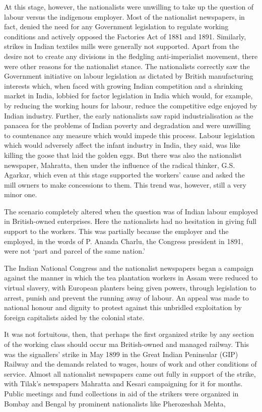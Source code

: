 At this stage, however, the nationalists were unwilling to take up the question of labour versus the indigenous employer. Most of the nationalist newspapers, in fact, denied the need for any Government legislation to regulate working conditions and actively opposed the Factories Act of 1881 and 1891. Similarly, strikes in Indian textiles mills were generally not supported. Apart from the desire not to create any divisions in the fledgling anti-imperialist movement, there were other reasons for the nationalist stance. The nationalists correctly saw the Government initiative on labour legislation as dictated by British manufacturing interests which, when faced with growing Indian competition and a shrinking market in India, lobbied for factor legislation in India which would, for example, by reducing the working hours for labour, reduce the competitive edge enjoyed by Indian industry. Further, the early nationalists saw rapid industrialisation as the panacea for the problems of Indian poverty and degradation and were unwilling to countenance any measure which would impede this process. Labour legislation which would adversely affect the infant industry in India, they said, was like killing the goose that laid the golden eggs. But there was also the nationalist newspaper, Mahratta, then under the influence of the radical thinker, G.S. Agarkar, which even at this stage supported the workers’ cause and asked the mill owners to make concessions to them. This trend was, however, still a very minor one.

The scenario completely altered when the question was of Indian labour employed in British-owned enterprises. Here the nationalists had no hesitation in giving full support to the workers. This was partially because the employer and the employed, in the words of P. Ananda Charlu, the Congress president in 1891, were not ‘part and parcel of the same nation.’

The Indian National Congress and the nationalist newspapers began a campaign against the manner in which the tea plantation workers in Assam were reduced to virtual slavery, with European planters being given powers, through legislation to arrest, punish and prevent the running away of labour. An appeal was made to national honour and dignity to protest against this unbridled exploitation by foreign capitalists aided by the colonial state.

It was not fortuitous, then, that perhaps the first organized strike by any section of the working class should occur ma British-owned and managed railway. This was the signallers’ strike in May 1899 in the Great Indian Peninsular (GIP) Railway and the demands related to wages, hours of work and other conditions of service. Almost all nationalist newspapers came out fully in support of the strike, with Tilak’s newspapers Mahratta and Kesari campaigning for it for months. Public meetings and fund collections in aid of the strikers were organized in Bombay and Bengal by prominent nationalists like Pherozeshah Mehta,

